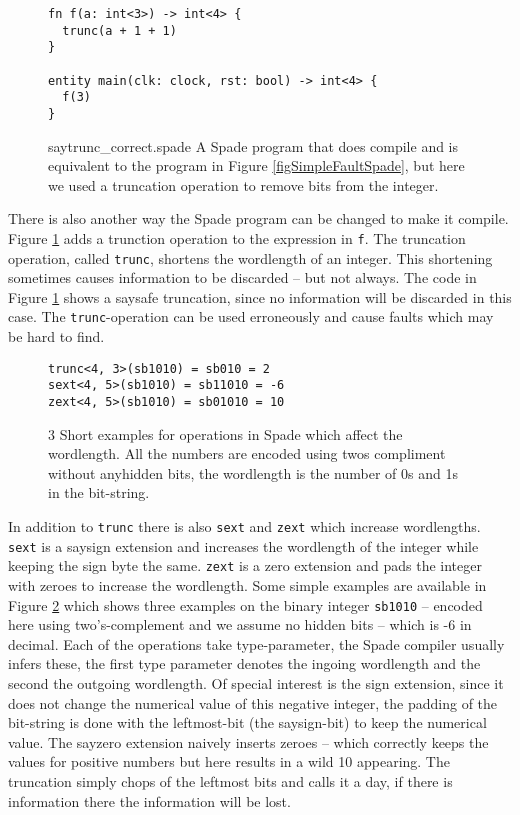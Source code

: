 \begin{figure}[h!]
\centering
  \begin{verbatim}
fn f(a: int<3>) -> int<4> {
  trunc(a + 1 + 1)
}

entity main(clk: clock, rst: bool) -> int<4> {
  f(3)
}
\end{verbatim}
  \caption{say{trunc\_correct.spade} A Spade program that does compile and is equivalent to the program in Figure \ref{figSimpleFaultSpade}, but here we used a truncation operation to remove bits from the integer.}
\label{figSimpleTruncSpade}
\end{figure}

There is also another way the Spade program can be changed to make it compile. Figure \ref{figSimpleTruncSpade} adds a trunction operation to the expression in \verb+f+. The truncation operation, called \verb+trunc+, shortens the wordlength of an integer. This shortening sometimes causes information to be discarded -- but not always. The code in Figure \ref{figSimpleTruncSpade} shows a say{safe} truncation, since no information will be discarded in this case. The \verb+trunc+-operation can be used erroneously and cause faults which may be hard to find.

\begin{figure}[h!]
\centering
\begin{verbatim}
trunc<4, 3>(sb1010) = sb010 = 2
sext<4, 5>(sb1010) = sb11010 = -6
zext<4, 5>(sb1010) = sb01010 = 10
\end{verbatim}
  \caption{3 Short examples for operations in Spade which affect the wordlength. All the numbers are encoded using twos compliment without anyhidden bits, the wordlength is the number of 0s and 1s in the bit-string.}
\label{figSext}
\end{figure}

In addition to \verb+trunc+ there is also \verb+sext+ and \verb+zext+ which increase wordlengths. \verb+sext+ is a say{sign extension} and increases the wordlength of the integer while keeping the sign byte the same. \verb+zext+ is a zero extension and pads the integer with zeroes to increase the wordlength. Some simple examples are available in Figure \ref{figSext} which shows three examples on the binary integer \verb+sb1010+ -- encoded here using two's-complement and we assume no hidden bits --  which is -6 in decimal. Each of the operations take type-parameter, the Spade compiler usually infers these, the first type parameter denotes the ingoing wordlength and the second the outgoing wordlength. Of special interest is the sign extension, since it does not change the numerical value of this negative integer, the padding of the bit-string is done with the leftmost-bit (the say{sign}-bit) to keep the numerical value. The say{zero extension} naively inserts zeroes -- which correctly keeps the values for positive numbers but here results in a wild 10 appearing. The truncation simply chops of the leftmost bits and calls it a day, if there is information there the information will be lost.

